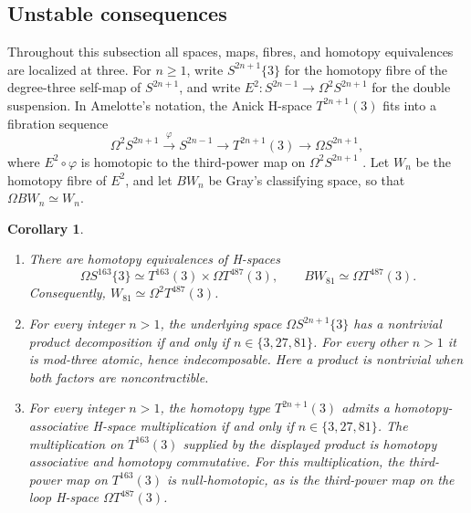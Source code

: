 \documentclass[11pt]{article}
\newtheorem{corollary}[theorem]{Corollary}
\theoremstyle{definition}
\theoremstyle{remark}
\numberwithin{equation}{section}
\begin{document}
\subsection{Unstable consequences}

Throughout this subsection all spaces, maps, fibres, and homotopy
equivalences are localized at three. For \(n\geq1\), write
\(S^{2n+1}\{3\}\) for the homotopy fibre of the degree-three self-map of
\(S^{2n+1}\), and write
\(E^2:S^{2n-1}\to\Omega^2S^{2n+1}\) for the double suspension.
In Amelotte's notation, the Anick H-space \(T^{2n+1}(3)\) fits into a
fibration sequence
\[
 \Omega^2S^{2n+1}\xrightarrow{\varphi}S^{2n-1}
 \longrightarrow T^{2n+1}(3)\longrightarrow\Omega S^{2n+1},
\]
where \(E^2\circ\varphi\) is homotopic to the third-power map on
\(\Omega^2S^{2n+1}\) \cite[Section~1]{Amelotte}.
Let \(W_n\) be the homotopy fibre of \(E^2\), and let \(BW_n\) be
Gray's classifying space, so that \(\Omega BW_n\simeq W_n\).

\begin{corollary}\label{intro:unstable-consequences}
\begin{enumerate}[label=\textup{(\roman*)}]
\item There are homotopy equivalences of H-spaces
\[
 \Omega S^{163}\{3\}\simeq T^{163}(3)\times\Omega T^{487}(3),
 \qquad BW_{81}\simeq\Omega T^{487}(3).
\]
Consequently, $W_{81}\simeq\Omega^2T^{487}(3)$.
\item For every integer $n>1$, the underlying space $\Omega S^{2n+1}\{3\}$ has a nontrivial product decomposition if and only if $n\in\{3,27,81\}$. For every other $n>1$ it is mod-three atomic, hence indecomposable. Here a product is nontrivial when both factors are noncontractible.
\item For every integer $n>1$, the homotopy type $T^{2n+1}(3)$ admits a homotopy-associative H-space multiplication if and only if $n\in\{3,27,81\}$. The multiplication on $T^{163}(3)$ supplied by the displayed product is homotopy associative and homotopy commutative. For this multiplication, the third-power map on $T^{163}(3)$ is null-homotopic, as is the third-power map on the loop H-space $\Omega T^{487}(3)$.
\end{enumerate}
\end{corollary}
\end{document}
